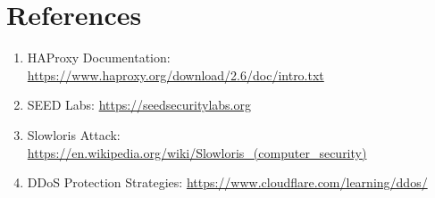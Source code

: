 \documentclass[12pt]{article}
\begin{document}
    \section{References}

    \begin{enumerate}
        \item HAProxy Documentation: \url{https://www.haproxy.org/download/2.6/doc/intro.txt}
        \item SEED Labs: \url{https://seedsecuritylabs.org}
        \item Slowloris Attack: \url{https://en.wikipedia.org/wiki/Slowloris_(computer_security)}
        \item DDoS Protection Strategies: \url{https://www.cloudflare.com/learning/ddos/}
    \end{enumerate}

    
\end{document}
